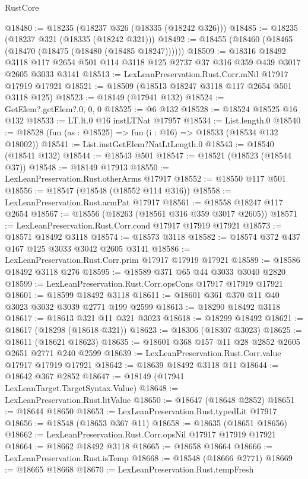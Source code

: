 \begin{lexlean}{RustCore}
\begin{coremodule}
@18480 := @18235 (@18237 @326 (@18335 (@18242 @326)))
@18485 := @18235 (@18237 @321 (@18335 (@18242 @321)))
@18492 := @18455 (@18460 (@18465 (@18470 (@18475 (@18480 (@18485 @18247))))))
@18509 := @18316
    @18492
    @3118
    @117
    @2654
    @501
    @114
    @3118
    @125
    @2737
    @37
    @316
    @359
    @439
    @3017
    @2605
    @3033
    @3141
@18513 := LexLeanPreservation.Rust.Corr.mNil @17917 @17919 @17921
@18521 := @18509 (@18513 @18247 @3118 @117 @2654 @501 @3118 @125)
@18523 := @18149 (@17941 @132)
@18524 := GetElem?.getElem?.{0, 0, 0}
@18525 := @6 @132
@18528 := @18524 @18525 @16 @132
@18533 := LT.lt.{0} @16 instLTNat @17957
@18534 := List.length.{0}
@18540 := @18528 (fun (as : @18525) => fun (i : @16) => @18533 (@18534 @132 @18002))
@18541 := List.instGetElem?NatLtLength.{0}
@18543 := @18540 (@18541 @132)
@18544 := @18543 @501
@18547 := @18521 (@18523 (@18544 @37))
@18548 := @18149 @17913
@18550 := LexLeanPreservation.Rust.otherArms @17917
@18552 := @18550 @117 @501
@18556 := @18547 (@18548 (@18552 @114 @316))
@18558 := LexLeanPreservation.Rust.armPat @17917
@18561 := @18558 @18247 @117 @2654
@18567 := @18556 (@18263 (@18561 @316 @359 @3017 @2605))
@18571 := LexLeanPreservation.Rust.Corr.cond @17917 @17919 @17921
@18573 := @18571 @18492 @3118
@18574 := @18573 @3118
@18582 := @18574 @372 @437 @167 @125 @3033 @3042 @2605 @3141
@18586 := LexLeanPreservation.Rust.Corr.prim @17917 @17919 @17921
@18589 := @18586 @18492 @3118 @276
@18595 := @18589 @371 @65 @44 @3033 @3040 @2820
@18599 := LexLeanPreservation.Rust.Corr.opsCons @17917 @17919 @17921
@18601 := @18599 @18492 @3118
@18611 := @18601 @361 @370 @11 @40 @3023 @3032 @3039 @2771 @199 @2599
@18613 := @18290 @18492 @3118
@18617 := @18613 @321 @11 @321 @3023
@18618 := @18299 @18492
@18621 := @18617 (@18298 (@18618 @321))
@18623 := @18306 (@18307 @3023)
@18625 := @18611 (@18621 @18623)
@18635 := @18601 @368 @157 @11 @28 @2852 @2605 @2651 @2771 @240 @2599
@18639 := LexLeanPreservation.Rust.Corr.value @17917 @17919 @17921
@18642 := @18639 @18492 @3118 @11
@18644 := @18642 @367 @2852
@18647 := @18149 (@17941 LexLeanTarget.TargetSyntax.Value)
@18648 := LexLeanPreservation.Rust.litValue
@18650 := @18647 (@18648 @2852)
@18651 := @18644 @18650
@18653 := LexLeanPreservation.Rust.typedLit @17917
@18656 := @18548 (@18653 @367 @11)
@18658 := @18635 (@18651 @18656)
@18662 := LexLeanPreservation.Rust.Corr.opsNil @17917 @17919 @17921
@18664 := @18662 @18492 @3118
@18665 := @18658 @18664
@18666 := LexLeanPreservation.Rust.isTemp
@18668 := @18548 (@18666 @2771)
@18669 := @18665 @18668
@18670 := LexLeanPreservation.Rust.tempFresh

\end{coremodule}
\end{lexlean}
